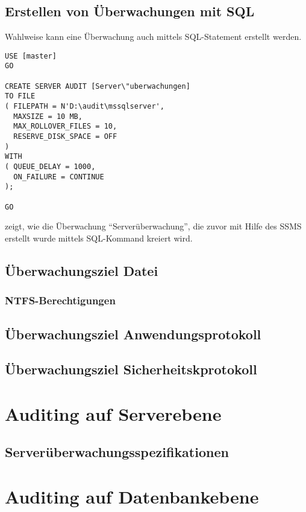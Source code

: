       \subsection{Erstellen von Überwachungen mit SQL}
        Wahlweise kann eine Überwachung auch mittels SQL-Statement erstellt
        werden.
        \begin{lstlisting}[language=ms_sql,caption={Erstellen
        einer Überwachung},label=sql21_01]
USE [master]
GO

CREATE SERVER AUDIT [Server\"uberwachungen]
TO FILE 
( FILEPATH = N'D:\audit\mssqlserver',
  MAXSIZE = 10 MB,
  MAX_ROLLOVER_FILES = 10,
  RESERVE_DISK_SPACE = OFF
)
WITH
( QUEUE_DELAY = 1000,
  ON_FAILURE = CONTINUE
);

GO          
        \end{lstlisting}
         zeigt, wie die Überwachung
        \enquote{Serverüberwachung}, die zuvor mit Hilfe des SSMS erstellt wurde
        mittels SQL-Kommand kreiert wird.
      \subsection{Überwachungsziel Datei}
        \subsubsection{NTFS-Berechtigungen}
      
      \subsection{Überwachungsziel Anwendungsprotokoll}
      
      \subsection{Überwachungsziel Sicherheitskprotokoll}
      
    \section{Auditing auf Serverebene}
      
      \subsection{Serverüberwachungsspezifikationen} 
    \section{Auditing auf Datenbankebene}
    
